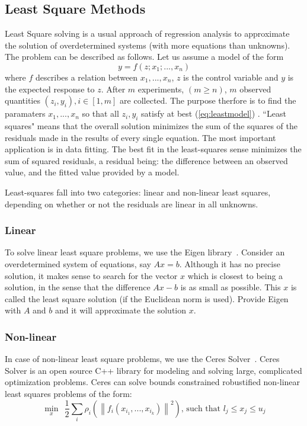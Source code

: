 \subsection{Least Square Methods}
\label{subsc:least}
Least Square solving is a usual approach of regression analysis to approximate the solution of overdetermined systems (with more equations than unknowns). The problem can be described as follows. Let us assume a model of the form
\begin{equation}
  y = f(z; x_1; ..., x_n)
  \label{eq:leastmodel}
\end{equation}
where $f$ describes a relation between $x_1, ..., x_n$, $z$ is the control variable and $y$ is the expected response to $z$. After $m$ experiments, $(m \geq n)$, $m$ observed quantities $(z_i, y_i), i \in [1, m]$ are collected. The purpose therfore is to find the paramaters $x_1, ..., x_n$ so that all $z_i, y_i$ satisfy at best (\ref{eq:leastmodel}) . ``Least squares" means that the overall solution minimizes the sum of the squares of the residuals made in the results of every single equation.
The most important application is in data fitting. The best fit in the least-squares sense minimizes the sum of squared residuals, a residual being: the difference between an observed value, and the fitted value provided by a model.

Least-squares fall into two categories: linear and non-linear least squares, depending on whether or not the residuals are linear in all unknowns.

\subsubsection{Linear}
To solve linear least square problems, we use the Eigen library~\cite{eigenweb}. Consider an overdetermined system of equations, say $Ax = b$. Although it has no precise solution, it makes sense to search for the vector $x$ which is closest to being a solution, in the sense that the difference $Ax - b$ is as small as possible. This $x$ is called the least square solution (if the Euclidean norm is used). Provide Eigen with $A$ and $b$ and it will approximate the solution $x$.

\subsubsection{Non-linear}
In case of non-linear least square problems, we use the Ceres Solver~\cite{ceres}. Ceres Solver is an open source C++ library for modeling and solving large, complicated optimization problems. Ceres can solve bounds constrained robustified non-linear least squares problems of the form:
\begin{equation*}
  \min_{x}\ \ \frac{1}{2} \sum_{i} \rho_i \left(\left\lVert f_i(x_{i_1}, ..., x_{i_k})  \right\rVert^2 \right) \text{, such that  } l_j \leq x_j \leq u_j
\end{equation*}

